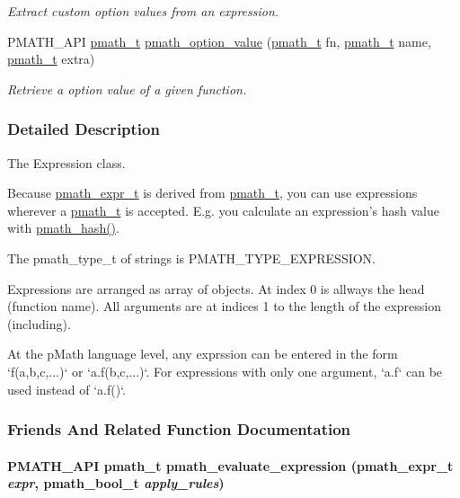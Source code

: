 \begin{CompactItemize}
\begin{CompactList}\small\item\em Extract custom option values from an expression. \item\end{CompactList}\item 
PMATH\_\-API \hyperlink{classpmath__t}{pmath\_\-t} \hyperlink{group__helpers_gc244ab0720278b396976728a39f8bde6}{pmath\_\-option\_\-value} (\hyperlink{classpmath__t}{pmath\_\-t} fn, \hyperlink{classpmath__t}{pmath\_\-t} name, \hyperlink{classpmath__t}{pmath\_\-t} extra)
\begin{CompactList}\small\item\em Retrieve a option value of a given function. \item\end{CompactList}\end{CompactItemize}


\subsubsection{Detailed Description}
The Expression class. 

Because \hyperlink{classpmath__expr__t}{pmath\_\-expr\_\-t} is derived from \hyperlink{classpmath__t}{pmath\_\-t}, you can use expressions wherever a \hyperlink{classpmath__t}{pmath\_\-t} is accepted. E.g. you calculate an expression's hash value with \hyperlink{group__objects_g9413cfb0b3fd00d361046189853a11d8}{pmath\_\-hash()}.

The pmath\_\-type\_\-t of strings is PMATH\_\-TYPE\_\-EXPRESSION.

Expressions are arranged as array of objects. At index 0 is allways the head (function name). All arguments are at indices 1 to the length of the expression (including).

At the pMath language level, any exprssion can be entered in the form `f(a,b,c,...)` or `a.f(b,c,...)`. For expressions with only one argument, `a.f` can be used instead of `a.f()`. 

\subsubsection{Friends And Related Function Documentation}
\hypertarget{classpmath__expr__t_d723e196e3d7f9078729bc0fb2fe7eed}{
\paragraph[{pmath\_\-evaluate\_\-expression}]{\setlength{\rightskip}{0pt plus 5cm}PMATH\_\-API {\bf pmath\_\-t} pmath\_\-evaluate\_\-expression ({\bf pmath\_\-expr\_\-t} {\em expr}, \/  {\bf pmath\_\-bool\_\-t} {\em apply\_\-rules})}\hfill}
\label{classpmath__expr__t_d723e196e3d7f9078729bc0fb2fe7eed}


